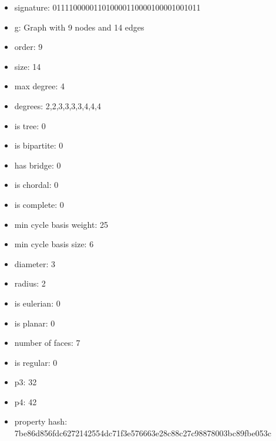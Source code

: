 \begin{figure}
\end{figure}
\begin{itemize}
\item signature: 011110000011010000110000100001001011
\item g: Graph with 9 nodes and 14 edges
\item order: 9
\item size: 14
\item max degree: 4
\item degrees: 2,2,3,3,3,3,4,4,4
\item is tree: 0
\item is bipartite: 0
\item has bridge: 0
\item is chordal: 0
\item is complete: 0
\item min cycle basis weight: 25
\item min cycle basis size: 6
\item diameter: 3
\item radius: 2
\item is eulerian: 0
\item is planar: 0
\item number of faces: 7
\item is regular: 0
\item p3: 32
\item p4: 42
\item property hash: 7be86d856fdc6272142554dc71f3e576663e28c88c27c98878003bc89fbe053c
\end{itemize}
\newpage
